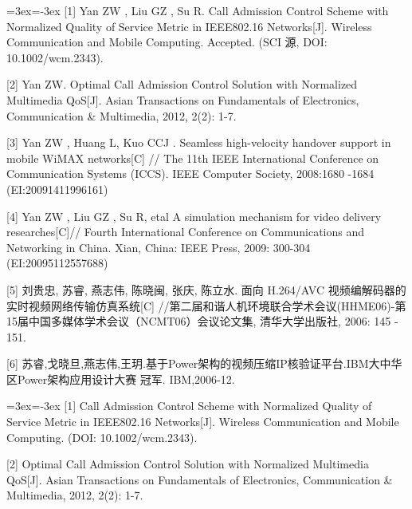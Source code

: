 \documentclass[
    doctor,
    truefont,
    pdflinks,
    ]{xjtuthesis}
\def\authornames{\BlindPeerReviewOFF}
\def\swithON{\BlindPeerReviewOFF}
\def\authornames{\BlindPeerReview}
\def\swithON{\BlindPeerReviewON}
\begin{document}
\begin{spacing}{1.2}
\ifx\authornames\swithON
{\wuhao \leftskip=3ex\parindent=-3ex
[1] Yan  ZW , Liu GZ , Su R. Call Admission Control Scheme with Normalized Quality of Service Metric in IEEE802.16 Networks[J].  Wireless Communication and Mobile Computing. Accepted. (SCI 源, DOI: 10.1002/wcm.2343).

[2] Yan ZW. Optimal Call Admission Control Solution with Normalized Multimedia QoS[J]. Asian Transactions on Fundamentals of Electronics, Communication \& Multimedia, 2012, 2(2): 1-7.


[3] Yan ZW ,  Huang L, Kuo CCJ .   Seamless high-velocity handover support in mobile WiMAX networks[C] //  The 11th IEEE  International Conference on Communication Systems (ICCS).  IEEE Computer Society, 2008:1680 -1684 (EI:20091411996161)

[4] Yan  ZW , Liu GZ , Su R, etal  A simulation
mechanism for video delivery researches[C]// Fourth International Conference on Communications and Networking in China. Xian, China: IEEE Press, 2009: 300-304 (EI:20095112557688)

[5] 刘贵忠, 苏睿, 燕志伟, 陈晓闽, 张庆, 陈立水.  面向 H.264/AVC 视频编解码器的实时视频网络传输仿真系统[C] //第二届和谐人机环境联合学术会议(HHME06)-第15届中国多媒体学术会议（NCMT06）会议论文集, 清华大学出版社, 2006: 145 - 151.

[6]  苏睿,戈晓旦,燕志伟,王玥.基于Power架构的视频压缩IP核验证平台.IBM大中华区Power架构应用设计大赛 冠军. IBM,2006-12.



}
\else
{\wuhao \leftskip=3ex\parindent=-3ex
[1] Call Admission Control Scheme with Normalized Quality of Service Metric in IEEE802.16 Networks[J].  Wireless Communication and Mobile Computing. (DOI: 10.1002/wcm.2343).

[2] Optimal Call Admission Control Solution with Normalized Multimedia QoS[J]. Asian Transactions on Fundamentals of Electronics, Communication \& Multimedia, 2012, 2(2): 1-7.

}
\end{spacing}
\end{document}
